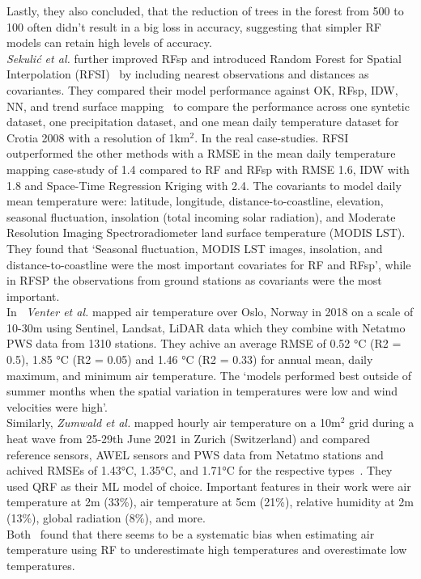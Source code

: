 Lastly, they also concluded, that the reduction of trees in the forest from 500 to 100 often didn't result in a big loss in accuracy, suggesting that simpler RF models can retain high levels of accuracy.\\
\textit{Sekuli{\'c} et al.} further improved RFsp and introduced Random Forest for Spatial Interpolation (RFSI)~\cite{sekulic2020random} by including nearest observations and distances as covariantes. They compared their model performance against OK, RFsp, IDW, NN, and trend surface mapping~\cite{chorley1965trend} to compare the performance across one syntetic dataset, one precipitation dataset, and one mean daily temperature dataset for Crotia 2008 with a resolution of 1km$^2$. In the real case-studies. RFSI outperformed the other methods with a RMSE in the mean daily temperature mapping case-study of 1.4 compared to RF and RFsp with RMSE 1.6, IDW with 1.8 and Space-Time Regression Kriging with 2.4. The covariants to model daily mean temperature were: latitude, longitude, distance-to-coastline, elevation, seasonal fluctuation, insolation (total incoming solar radiation), and Moderate Resolution Imaging Spectroradiometer land surface temperature (MODIS LST). They found that `Seasonal fluctuation, MODIS LST images, insolation, and distance-to-coastline were the most important covariates for RF and RFsp', while in RFSP the observations from ground stations as covariants were the most important.\\
In~\cite{venter2020hyperlocal} \textit{Venter et al.} mapped air temperature over Oslo, Norway in 2018 on a scale of 10-30m using Sentinel, Landsat, LiDAR data which they combine with Netatmo PWS data from 1310 stations. They achive an average RMSE of 0.52 °C (R2 = 0.5), 1.85 °C (R2 = 0.05) and 1.46 °C (R2 = 0.33) for annual mean, daily maximum, and minimum air temperature. The `models performed best outside of summer months when the spatial variation in temperatures were low and wind velocities were high'.\\
Similarly, \textit{Zumwald et al.} mapped hourly air temperature on a 10m$^2$ grid during a heat wave from 25-29th June 2021 in Zurich (Switzerland) and compared reference sensors, AWEL sensors and PWS data from Netatmo stations and achived RMSEs of 1.43°C, 1.35°C, and 1.71°C for the respective types~\cite{zumwald2021mapping}. They used QRF as their ML model of choice. Important features in their work were air temperature at 2m (33\%), air temperature at 5cm (21\%), relative humidity at 2m (13\%), global radiation (8\%), and more.\\
Both~\cite{zumwald2021mapping, zhang2012bias} found that there seems to be a systematic bias when estimating air temperature using RF to underestimate high temperatures and overestimate low temperatures.

